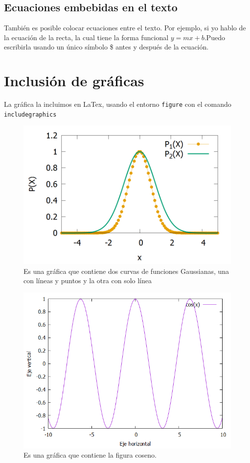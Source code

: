 \documentclass[onecolumn]{article} %
\begin{document}
\subsection{Ecuaciones embebidas en el texto}
También es posible colocar ecuaciones entre el texto. Por ejemplo, si yo hablo de la ecuación de la recta, la cual tiene la forma funcional $y=mx+b$.Puedo escribirla usando un único símbolo \$ antes y después de la ecuación.


\section{Inclusión de gráficas} %
La gráfica la incluimos en LaTex, usando el entorno \verb+figure+ con el comando \verb+includegraphics+
\begin{figure}[h!]%
	\centering %
	\includegraphics[scale=0.2]{Grafica26Nov.png}
	\caption{\label{fig_exp}Es una gráfica que contiene dos curvas de funciones Gaussianas, una con líneas y puntos y 		la otra con solo línea} %
\end{figure}
\begin{figure}[h!]%
	\centering %
	\includegraphics[scale=0.2]{grafica_16Nov.png}
	\caption{\label{fig_cos}Es una gráfica que contiene la figura coseno.} %
\end{figure}
\end{document}
